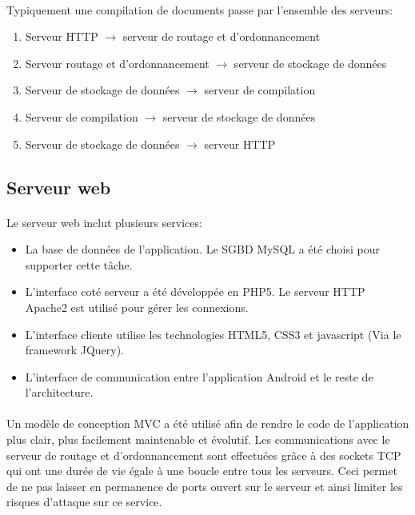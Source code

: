 \documentclass[a4paper,12pt]{article}
\begin{document}
\paragraph*{}
Typiquement une compilation de documents passe par l'ensemble des serveurs:
\begin{enumerate}
 \item Serveur HTTP $\rightarrow$ serveur de routage et d'ordonnancement
 \item Serveur routage et d'ordonnancement $\rightarrow$ serveur de stockage de données
 \item Serveur de stockage de données $\rightarrow$ serveur de compilation
 \item Serveur de compilation $\rightarrow$ serveur de stockage de données
 \item Serveur de stockage de données $\rightarrow$ serveur HTTP
\end{enumerate}



\subsection{Serveur web}
\paragraph*{}
Le serveur web inclut plusieurs services:
\begin{itemize}
 \item La base de données de l'application. Le SGBD MySQL a été choisi pour supporter cette tâche.
 \item L'interface coté serveur a été développée en PHP5. Le serveur HTTP Apache2 est utilisé pour gérer les connexions.
 \item L'interface cliente utilise les technologies HTML5, CSS3 et javascript (Via le framework JQuery).
 \item L'interface de communication entre l'application Android et le reste de l'architecture.
\end{itemize}

\paragraph*{}
Un modèle de conception MVC a été utilisé afin de rendre le code de l'application plus clair, plus facilement maintenable et évolutif. Les communications avec le serveur de routage et d'ordonnancement sont effectuées grâce à des sockets TCP qui ont une durée de vie égale à une boucle entre tous les serveurs. Ceci permet de ne pas laisser en permanence de ports ouvert sur le serveur et ainsi limiter les risques d'attaque sur ce service.
\end{document}
